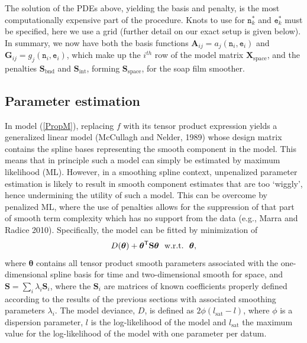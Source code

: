 \documentclass[10pt] {article}
\newcommand{\beq}{\begin{equation}}
\newcommand{\eeq}{\end{equation}}
\newcommand{\ts}{^{\sf T}}
\theoremstyle{definition}
\theoremstyle{plain}
\begin{document}
The solution of the PDEs above, yielding the basis and penalty, is the most computationally expensive part of the procedure. Knots to use for $\texttt{n}_k^*$ and $\texttt{e}_k^*$ must be specified, here we use a grid (further detail on our exact setup is given below). In summary, we now have both the basis functions $\textbf{A}_{ij}=a_j(\texttt{n}_i,\texttt{e}_i)$ and $\mathbf{G}_{ij}=g_j(\texttt{n}_i,\texttt{e}_i)$, which make up the $i^{th}$ row of the model matrix $\textbf{X}_\text{space}$, and the penalties $\textbf{S}_\text{bnd}$ and $\textbf{S}_\text{int}$, forming $\textbf{S}_\text{space}$, for the soap film smoother.



\subsection{Parameter estimation \label{PE}}

In model (\ref{PropM}), replacing $f$ with its tensor product expression yields a generalized linear model (McCullagh and Nelder, 1989) whose design matrix contains the spline bases representing the smooth component in the model. This means that in principle such
a model can simply be estimated by maximum likelihood (ML). However, in a smoothing spline context, unpenalized parameter estimation is likely to result in smooth component estimates that are too `wiggly', hence undermining the utility of such a model. This can be overcome by penalized ML, where the use of penalties allows for the suppression of that part of smooth term complexity which has no support from the data (e.g., Marra and Radice 2010). Specifically, the model can be fitted by minimization of
\beq
D(\bm\theta) + \bm\theta\ts\textbf{S}\bm\theta \ \  \text{w.r.t.} \ \  \bm\theta,
\label{Dev}
\eeq
where $\bm\theta$ contains all tensor product smooth parameters associated with the one-dimensional spline basis for time and two-dimensional smooth for space, and $\textbf{S}=\sum_i \lambda_i \textbf{S}_i$, where the $\textbf{S}_i$ are matrices of known coefficients properly defined according to the results of the previous sections with associated smoothing parameters $\lambda_i$. The model deviance, $D$, is defined as $2\phi(l_{\text{sat}}-l)$, where $\phi$ is a dispersion parameter, $l$ is the log-likelihood of the model and $l_{\text{sat}}$ the maximum value for the log-likelihood of the model with one parameter per datum. 
\end{document}
